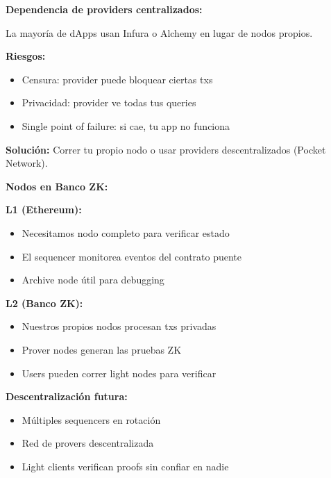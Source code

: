 \documentclass[11pt,a4paper,twoside,openright]{book}
\theoremstyle{definition}
\theoremstyle{plain}
\theoremstyle{remark}
\begin{document}
\begin{advertencia}
\textbf{Dependencia de providers centralizados:}

La mayoría de dApps usan Infura o Alchemy en lugar de nodos propios.

\textbf{Riesgos:}
\begin{itemize}
    \item Censura: provider puede bloquear ciertas txs
    \item Privacidad: provider ve todas tus queries
    \item Single point of failure: si cae, tu app no funciona
\end{itemize}

\textbf{Solución:} Correr tu propio nodo o usar providers descentralizados (Pocket Network).
\end{advertencia}

\begin{bancozk}
\textbf{Nodos en Banco ZK:}

\textbf{L1 (Ethereum):}
\begin{itemize}
    \item Necesitamos nodo completo para verificar estado
    \item El sequencer monitorea eventos del contrato puente
    \item Archive node útil para debugging
\end{itemize}

\textbf{L2 (Banco ZK):}
\begin{itemize}
    \item Nuestros propios nodos procesan txs privadas
    \item Prover nodes generan las pruebas ZK
    \item Users pueden correr light nodes para verificar
\end{itemize}

\textbf{Descentralización futura:}
\begin{itemize}
    \item Múltiples sequencers en rotación
    \item Red de provers descentralizada
    \item Light clients verifican proofs sin confiar en nadie
\end{itemize}
\end{bancozk}

\end{document}
